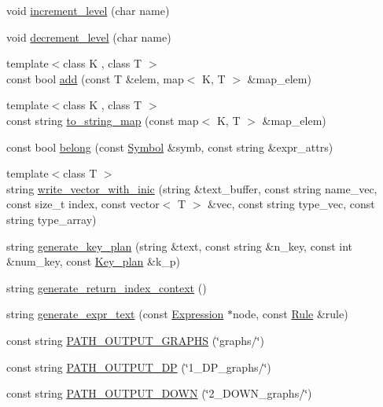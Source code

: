 \begin{DoxyCompactItemize}
\item 
void \hyperlink{namespacegenevalmag_a0cd76ff96d0edddb2332eb74a4085ab5}{increment\_\-level} (char name)
\item 
void \hyperlink{namespacegenevalmag_ac34c135063b809b19dafd05aa81297c8}{decrement\_\-level} (char name)
\item 
{\footnotesize template$<$class K , class T $>$ }\\const bool \hyperlink{namespacegenevalmag_a95d75ecfcb4371b57086093c66a96bd4}{add} (const T \&elem, map$<$ K, T $>$ \&map\_\-elem)
\item 
{\footnotesize template$<$class K , class T $>$ }\\const string \hyperlink{namespacegenevalmag_abdfa348edf2ec215b8dce63ebeab02e9}{to\_\-string\_\-map} (const map$<$ K, T $>$ \&map\_\-elem)
\item 
const bool \hyperlink{namespacegenevalmag_a9cb36d1a43794afa2b45c729c6c87170}{belong} (const \hyperlink{classgenevalmag_1_1Symbol}{Symbol} \&symb, const string \&expr\_\-attrs)
\item 
{\footnotesize template$<$class T $>$ }\\string \hyperlink{namespacegenevalmag_af74af87309332e02ec5d55c14ab1fa97}{write\_\-vector\_\-with\_\-inic} (string \&text\_\-buffer, const string name\_\-vec, const size\_\-t index, const vector$<$ T $>$ \&vec, const string type\_\-vec, const string type\_\-array)
\item 
string \hyperlink{namespacegenevalmag_ac58f50a004a774ce4256b86a16fb96c0}{generate\_\-key\_\-plan} (string \&text, const string \&n\_\-key, const int \&num\_\-key, const \hyperlink{structgenevalmag_1_1k__plan}{Key\_\-plan} \&k\_\-p)
\item 
string \hyperlink{namespacegenevalmag_ad027bb2060fc75b17da08a22c9be3b9a}{generate\_\-return\_\-index\_\-context} ()
\item 
string \hyperlink{namespacegenevalmag_a5935695d2ab4f63ea670911809399ce0}{generate\_\-expr\_\-text} (const \hyperlink{classgenevalmag_1_1Expression}{Expression} $\ast$node, const \hyperlink{classgenevalmag_1_1Rule}{Rule} \&rule)
\item 
const string \hyperlink{namespacegenevalmag_a306e982e69207c606c1d6f236259b4e1}{PATH\_\-OUTPUT\_\-GRAPHS} (\char`\"{}graphs/\char`\"{})
\item 
const string \hyperlink{namespacegenevalmag_a6d797bb23dc6e170ede7178c9ddb3f08}{PATH\_\-OUTPUT\_\-DP} (\char`\"{}1\_\-DP\_\-graphs/\char`\"{})
\item 
const string \hyperlink{namespacegenevalmag_afce5456f0ffc52ff62202b4c185d453c}{PATH\_\-OUTPUT\_\-DOWN} (\char`\"{}2\_\-DOWN\_\-graphs/\char`\"{})

\end{DoxyCompactItemize}
